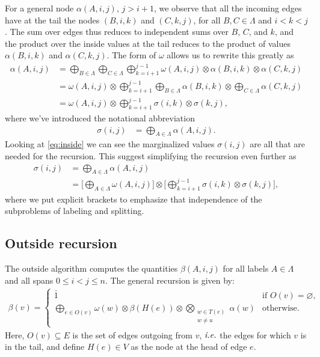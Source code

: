   For a general node $\alpha(A, i, j)$, $j > i + 1$, we observe that all the incoming edges have at the tail the nodes $(B, i, k)$ and $(C, k, j)$, for all $B, C \in \Lambda$ and $i < k < j$. The sum over edges thus reduces to independent sums over $B$, $C$, and $k$, and the product over the inside values at the tail reduces to the product of values $\alpha(B, i, k)$ and $\alpha(C, k, j)$. The form of $\omega$ allows us to rewrite this greatly as
  \begin{align}
    \label{eq:inside}
    \alpha(A, i, j)
      &= \bigoplus_{B \in \Lambda} \bigoplus_{C \in \Lambda} \bigoplus_{k=i+1}^{j-1} \omega(A, i, j) \otimes \alpha(B,i,k) \otimes \alpha(C,k,j) \nonumber \\
      &= \omega(A, i, j) \otimes \bigoplus_{k=i+1}^{j-1} \bigoplus_{B \in \Lambda} \alpha(B,i,k) \otimes \bigoplus_{C \in \Lambda} \alpha(C,k,j) \nonumber \\
      &= \omega(A, i, j) \otimes \bigoplus_{k=i+1}^{j-1} \sigma(i,k) \otimes \sigma(k,j),
  \end{align}
  where we've introduced the notational abbreviation
  \begin{align*}
      \sigma(i,j) &= \bigoplus_{A \in \Lambda} \alpha(A,i,j).
  \end{align*}
  Looking at \ref{eq:inside} we can see the marginalized values $\sigma(i, j)$ are all that are needed for the recursion. This suggest simplifying the recursion even further as
  \begin{align}
    \label{eq:inside-simplified}
    \sigma(i, j)
      &= \bigoplus_{A \in \Lambda} \alpha(A,i,j) \nonumber \\
      &= \Bigg[ \bigoplus_{A \in \Lambda} \omega(A, i, j) \Bigg] \otimes \Bigg[\bigoplus_{k=i+1}^{j-1} \sigma(i,k) \otimes  \sigma(k,j) \Bigg],
  \end{align}
  where we put explicit brackets to emphasize that independence of the subproblems of labeling and splitting.

\subsection{Outside recursion}
  The outside algorithm computes the quantities $\beta(A,i,j)$ for all labels $A \in \Lambda$ and all spans $0 \leq i < j \leq n$. The general recursion is given by:
  \begin{align*}
    \beta(v) =
      \begin{cases}
        \bar{1}  & \mbox{if } O(v) = \varnothing, \\
        \displaystyle\bigoplus_{e \in O(v)} \omega(w) \otimes \beta(H(e)) \otimes \displaystyle\bigotimes_{ \substack{ w \in T(e) \\ w \neq u } } \alpha(w)  & \mbox{otherwise.}
      \end{cases}
  \end{align*}
  Here, $O(v) \subseteq E$ is the set of edges outgoing from $v$, $\emph{i.e.}$ the edges for which $v$ is in the tail, and define $H(e) \in V$ as the node at the head of edge $e$.

